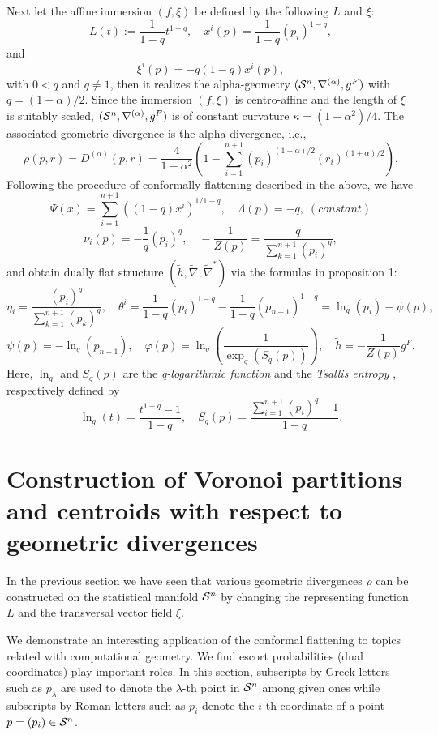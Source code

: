 \documentclass{llncs}
\begin{document}
Next let the affine immersion $(f,\xi)$ be defined by 
the following $L$ and $\xi$:
\[
	L(t):=\frac{1}{1-q}t^{1-q}, \quad x^i(p)=\frac{1}{1-q}(p_i)^{1-q},
\]
and
\[
	\xi^i(p)=-q(1-q)x^i(p),
\]
with $0 <q$ and $q \not=1$, 
then it realizes the alpha-geometry  \cite{AN}
$({\cal S}^n,\nabla^{(\alpha)}, g^F)$ with $q=(1+\alpha)/2$.
Since the immersion $(f, \xi)$ is centro-affine and the length of 
$\xi$ is suitably scaled, $({\cal S}^n,\nabla^{(\alpha)}, g^F)$ 
is of constant curvature $\kappa=(1-\alpha^2)/4$.
The associated geometric divergence is the alpha-divergence, i.e.,
\begin{equation}
	\rho(p,r)=D^{(\alpha)}(p,r)=\frac{4}{1-\alpha^2}
	\left(
	1-\sum_{i=1}^{n+1}(p_i)^{(1-\alpha)/2}(r_i)^{(1+\alpha)/2}
	\right).
\label{alpha_div}
\end{equation}
Following the procedure of conformally flattening  
described in the above, we have \cite{OMA10}
\[
	\Psi(x)=\sum_{i=1}^{n+1} ((1-q)x^i)^{1/{1-q}},
	\quad \Lambda(p)=-q, \; (constant) 
\]
\[
	\nu_i(p)=-\frac{1}{q}(p_i)^{q}, \quad 
	-\frac{1}{Z(p)}=\frac{q}{\sum_{k=1}^{n+1} (p_i)^q},
\]
and obtain dually flat structure 
$(\tilde h, \tilde \nabla, \tilde \nabla^*)$
via the formulas in proposition 1:
\[
	\eta_i=\frac{(p_i)^{q}}{\sum_{k=1}^{n+1}(p_k)^{q}}, \quad
	\theta^i=\frac{1}{1-q}(p_i)^{1-q} - \frac{1}{1-q}(p_{n+1})^{1-q}
	=\ln_q(p_i)-\psi(p),
\]
\[
	\psi(p)=-\ln_q(p_{n+1}), \quad 
	\varphi(p)=\ln_q \left( \frac{1}{\exp_q (S_q(p))} \right), \quad
	\tilde h=-\frac{1}{Z(p)}g^F.
\]
Here, $\ln_q$ and $S_q(p)$ are the {\em q-logarithmic function} and 
the {\em Tsallis entropy} \cite{Tsallis09}, respectively defined by
\[
	\ln_q(t)=\frac{t^{1-q}-1}{1-q}, \quad 
		S_q(p)=\frac{\sum_{i=1}^{n+1}(p_i)^q -1}{1-q}.
\]

\section{Construction of Voronoi partitions 
and centroids with respect to geometric divergences}
In the previous section we have seen that various geometric divergences 
$\rho$ can be constructed on the statistical manifold ${\cal S}^n$ 
by changing the representing function $L$ and the transversal vector 
field $\xi$.

We demonstrate an interesting application of the conformal flattening to 
topics related with computational geometry.
We find escort probabilities (dual coordinates) play important roles. 
In this section, subscripts by Greek letters such as $p_\lambda$  
are used to denote the $\lambda$-th point in ${\cal S}^n$ among given ones 
while subscripts by Roman letters such as $p_i$ denote 
the $i$-th coordinate of a point $p=(p_i) \in {\cal S}^n$.
\end{document}
